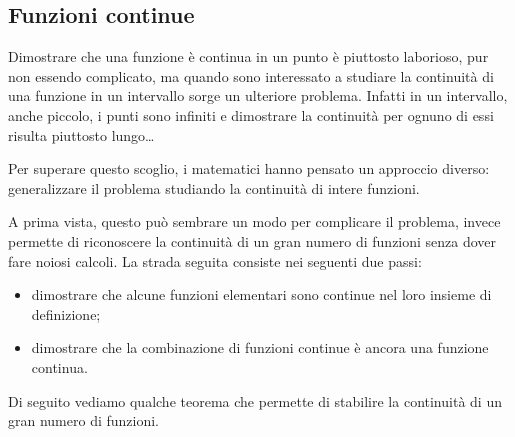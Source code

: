 % 

\subsection{Funzioni continue}
\label{subsec:cont_definizione}

Dimostrare che una funzione è continua in un punto è piuttosto laborioso, 
pur non essendo complicato, ma quando sono interessato a studiare la 
continuità di una funzione in un intervallo sorge un ulteriore problema. 
Infatti in un intervallo, anche piccolo, i punti sono infiniti e dimostrare 
la continuità per ognuno di essi risulta piuttosto lungo\dots

Per superare questo scoglio, i matematici hanno pensato un approccio 
diverso:
generalizzare il problema studiando la continuità di intere funzioni.

A prima vista, questo può sembrare un modo per complicare il problema, 
invece permette di riconoscere la continuità di un gran numero di 
funzioni senza dover fare noiosi calcoli. La strada seguita consiste nei 
seguenti due passi:
\begin{itemize} [noitemsep]
\item dimostrare che alcune funzioni elementari sono continue nel loro 
insieme di definizione;
\item dimostrare che la combinazione di funzioni continue è ancora una 
funzione continua.
\end{itemize}
Di seguito vediamo qualche teorema che permette di stabilire la continuità di 
un gran numero di funzioni.

